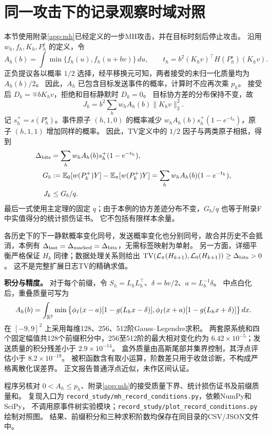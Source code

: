 \section{同一攻击下的记录观察时域对照}
\label{app:record-ablation}
本节使用附录\ref{app:mh}已经定义的一步MH攻击，并在目标时刻后停止攻击。
沿用 $w_h,f_h,K_h,P_h^s$ 的定义，令
\begin{equation}
 A_h(b)=\int\min\{f_h(u),f_h(u+bv)\}\,du,\qquad
 t_h=b^2(K_hv)^\top H(P_h^s)(K_hv).
 \label{eq:mh-overlap}
\end{equation}
正负提议各以概率 $1/2$ 选择，经平移换元可知，两者接受的未归一化质量均为 $A_h(b)/2$。
因此，$A_h$ 已包含目标发送事件的概率，计算时不应再次乘 $p_h$。
接受后 $D_k=\mp bK_hv$，拒绝和目标静默时 $D_k=0$。
目标协方差的分布保持不变，故
\begin{equation}
 J_k=b^2\sum_h w_hA_h(b)\|K_hv\|_2^2.
 \label{eq:mh-numerical-damage}
\end{equation}
记 $s_h^+=s(P_h^s)$。事件原子 $(h,1,0)$ 的概率减少
$w_hA_h(b)s_h^+(1-e^{-t_h})$，原子 $(h,1,1)$ 增加同样的概率。
因此，TV定义中的 $1/2$ 因子与两类原子相抵，得到
\begin{equation}
 \begin{aligned}
 \Delta_{\rm bits}&=\sum_h w_hA_h(b)s_h^+(1-e^{-t_h}),\\
 G_b&:=\mathbb E_0[w(P_k^+)Y]-\mathbb E_\pi[w(P_k^+)Y]
      =\sum_h w_hA_h(b)(1-e^{-t_h}),\\
 J_k&\le G_b/q.
 \end{aligned}
 \label{eq:mh-next-event}
\end{equation}
最后一式使用主定理的固定 $q$；由于本例的协方差迹分布不变，$G_b/q$ 也等于附录F中实值得分的统计损伤证书。
它不包括有限样本余量。

各历史下的下一静默概率变化同号，发送概率变化也分别同号，故合并历史不会抵消，本例有
$\Delta_{\rm last}=\Delta_{\rm marked}=\Delta_{\rm bits}$，无需标签映射为单射。
另一方面，详细平衡严格保证 $H_k$ 同律；数据处理关系则给出
$\operatorname{TV}(\mathcal L_\pi(H_{k+1}),\mathcal L_0(H_{k+1}))\ge\Delta_{\rm bits}>0$。
这不是完整扩展日志TV的精确求值。

\textbf{积分与精度。}
对于每个前缀，令 $S_h=L_hL_h^\top$、$\delta=bv/2$、$a=L_h^{-1}\delta$。
中点白化后，重叠质量可写为
\begin{equation}
 A_h(b)=\int_{\mathbb R^2}\min\big\{
 \phi_I(x-a)[1-g(L_hx-\delta)],
 \phi_I(x+a)[1-g(L_hx+\delta)]\big\}\,dx.
 \label{eq:mh-whitened}
\end{equation}
在 $[-9,9]^2$ 上采用每维128、256、512阶Gauss--Legendre求积。
两套原系统和四个固定幅值共128个前缀积分中，256至512阶的最大相对变化约为
$6.42\times10^{-5}$；发送质量的积分残差小于 $2.9\times10^{-14}$。
盒外质量由高斯尾部并集界控制，其浮点评估小于 $8.2\times10^{-19}$。
被积函数含有取小运算，阶数差只用于收敛诊断，不构成严格离散化误差界。
正文报告普通浮点近似，未作区间认证。

程序另核对 $0<A_h\le p_h$、附录\ref{app:mh}的接受质量下界、统计损伤证书及前缀质量和。
复现入口为 \texttt{record\_study/mh\_record\_conditions.py}，依赖NumPy和SciPy，
不调用原事件树实验模块；\texttt{record\_study/plot\_record\_conditions.py}绘制对照图。
结果、前缀积分和三种求积阶数均保存在同目录的CSV/JSON文件中。
